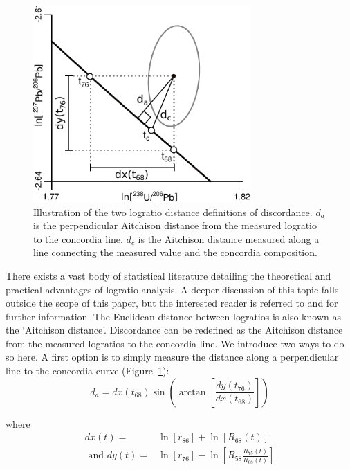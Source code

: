 \documentclass[gchron, manuscript]{copernicus}
\begin{document}
\begin{figure}
  \includegraphics[width=8.3cm]{Aitchison.pdf}
  \caption{Illustration of the two logratio distance definitions of
    discordance. $d_a$ is the perpendicular Aitchison distance from
    the measured logratio to the concordia line. $d_c$ is the
    Aitchison distance measured along a line connecting the measured
    value and the concordia composition.
  }
  \label{fig:aitchison}
\end{figure}

There exists a vast body of statistical literature detailing the
theoretical and practical advantages of logratio analysis. A deeper
discussion of this topic falls outside the scope of this paper, but
the interested reader is referred to \citet{aitchison1986} and
\citet{pawlowsky2015} for further information. The Euclidean distance
between logratios is also known as the `Aitchison distance'.
Discordance can be redefined as the Aitchison distance from the
measured logratios to the concordia line. We introduce two ways to do
so here.  A first option is to simply measure the distance along a
perpendicular line to the concordia curve
(Figure~\ref{fig:aitchison}):
\begin{equation}
  d_{a} = dx(t_{68})
  \sin\!\left(\arctan\!\left[ \frac{dy(t_{76})}{dx(t_{68})} \right]
  \right)
  \label{eq:dperp}
\end{equation}

\noindent where
\begin{equation}
\begin{split}
  dx(t)  = & \ln\!\left[r_{86}\right] + \ln\!\left[R_{68}(t)\right] \\
  \mbox{~and~}
  dy(t) = & \ln\!\left[r_{76}\right] -
  \ln\!\left[R_{58}\frac{R_{75}(t)}{R_{68}(t)}\right]
  \end{split}
\end{equation}
\end{document}
